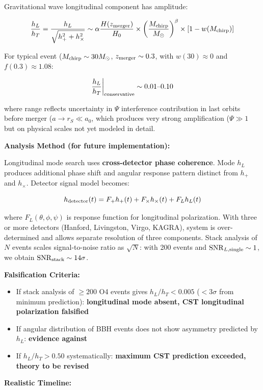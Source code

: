 \documentclass[11pt,a4paper]{article}
\providecommand{\tightlist}{\setlength{\itemsep}{0pt}\setlength{\parskip}{0pt}}
\begin{document}
Gravitational wave longitudinal component has amplitude:

\[\frac{h_L}{h_T} = \frac{h_L}{\sqrt{h_+^2 + h_\times^2}} \sim \alpha \frac{H(z_{\rm merger})}{H_0} \times \left(\frac{M_{\rm chirp}}{M_\odot}\right)^\beta \times [1-w(M_{\rm chirp})]\]

For typical event (\(M_{\rm chirp} \sim 30 M_\odot\),
\(z_{\rm merger} \sim 0.3\), with \(w(30) \approx 0\) and
\(f(0.3) \approx 1.08\):

\[\frac{h_L}{h_T}\bigg|_{\rm conservative} \sim 0.01\text{--}0.10\]

where range reflects uncertainty in \(\Psi\) interference contribution
in last orbits before merger (\(a \to r_S \ll a_0\), which produces
very strong amplification (\(\Psi \gg 1\) but on physical scales not
yet modeled in detail.

\textbf{Analysis Method (for future implementation):}

Longitudinal mode search uses \textbf{cross-detector phase coherence}.
Mode \(h_L\) produces additional phase shift and angular response
pattern distinct from \(h_+\) and \(h_\times\). Detector signal model
becomes:

\[h_{\rm detector}(t) = F_+ h_+(t) + F_\times h_\times(t) + F_L h_L(t)\]

where \(F_L(\theta,\phi,\psi)\) is response function for longitudinal
polarization. With three or more detectors (Hanford, Livingston, Virgo,
KAGRA), system is over-determined and allows separate resolution of
three components. Stack analysis of \(N\) events scales signal-to-noise
ratio as \(\sqrt{N}\): with 200 events and
\({\rm SNR}_{L,\rm single} \sim 1\), we obtain
\({\rm SNR}_{\rm stack} \sim 14\sigma\).

\textbf{Falsification Criteria:}

\begin{itemize}
\tightlist
\item
  If stack analysis of \(\geq 200\) O4 events gives \(h_L/h_T < 0.005\)
  (\(< 3\sigma\) from minimum prediction): \textbf{longitudinal mode
  absent, CST longitudinal polarization falsified}
\item
  If angular distribution of BBH events does not show asymmetry
  predicted by \(h_L\): \textbf{evidence against}
\item
  If \(h_L/h_T > 0.50\) systematically: \textbf{maximum CST prediction
  exceeded, theory to be revised}
\end{itemize}

\textbf{Realistic Timeline:}
\end{document}
